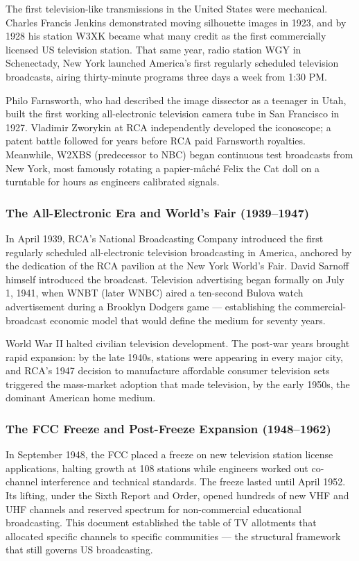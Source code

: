 \documentclass[11pt,letterpaper]{article}
\begin{document}
The first television-like transmissions in the United States were mechanical. Charles Francis Jenkins demonstrated moving silhouette images in 1923, and by 1928 his station W3XK became what many credit as the first commercially licensed US television station. That same year, radio station WGY in Schenectady, New York launched America's first regularly scheduled television broadcasts, airing thirty-minute programs three days a week from 1:30 PM.

Philo Farnsworth, who had described the image dissector as a teenager in Utah, built the first working all-electronic television camera tube in San Francisco in 1927. Vladimir Zworykin at RCA independently developed the iconoscope; a patent battle followed for years before RCA paid Farnsworth royalties. Meanwhile, W2XBS (predecessor to NBC) began continuous test broadcasts from New York, most famously rotating a papier-mâché Felix the Cat doll on a turntable for hours as engineers calibrated signals.

\subsubsection{The All-Electronic Era and World's Fair (1939--1947)}

In April 1939, RCA's National Broadcasting Company introduced the first regularly scheduled all-electronic television broadcasting in America, anchored by the dedication of the RCA pavilion at the New York World's Fair. David Sarnoff himself introduced the broadcast. Television advertising began formally on July 1, 1941, when WNBT (later WNBC) aired a ten-second Bulova watch advertisement during a Brooklyn Dodgers game --- establishing the commercial-broadcast economic model that would define the medium for seventy years.

World War II halted civilian television development. The post-war years brought rapid expansion: by the late 1940s, stations were appearing in every major city, and RCA's 1947 decision to manufacture affordable consumer television sets triggered the mass-market adoption that made television, by the early 1950s, the dominant American home medium.

\subsubsection{The FCC Freeze and Post-Freeze Expansion (1948--1962)}

In September 1948, the FCC placed a freeze on new television station license applications, halting growth at 108 stations while engineers worked out co-channel interference and technical standards. The freeze lasted until April 1952. Its lifting, under the Sixth Report and Order, opened hundreds of new VHF and UHF channels and reserved spectrum for non-commercial educational broadcasting. This document established the table of TV allotments that allocated specific channels to specific communities --- the structural framework that still governs US broadcasting.
\end{document}
